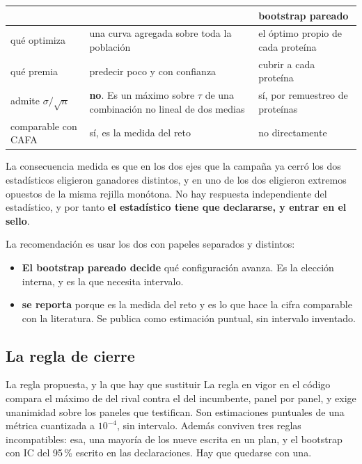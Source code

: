 \begin{center}
\begin{tabularx}{\linewidth}{@{}L{3.2cm} X X@{}}
\toprule
 &  & bootstrap pareado\\
\midrule
qué optimiza & una curva agregada sobre toda la población & el óptimo propio de cada proteína\\
qué premia   & predecir poco y con confianza & cubrir a cada proteína\\
admite $\sigma/\sqrt{n}$ & \textbf{no}. Es un máximo sobre $\tau$ de una combinación no lineal de dos medias & sí, por remuestreo de proteínas\\
comparable con CAFA & sí, es la medida del reto & no directamente\\
\bottomrule
\end{tabularx}
\end{center}

La consecuencia medida es que en los dos ejes que la campaña ya cerró los dos
estadísticos eligieron ganadores distintos, y en uno de los dos eligieron extremos
opuestos de la misma rejilla monótona. No hay respuesta independiente del
estadístico, y por tanto \textbf{el estadístico tiene que declararse, y entrar en
el sello}.

La recomendación es usar los dos con papeles separados y distintos:

\begin{itemize}[leftmargin=1.4em,itemsep=0.3em]
  \item \textbf{El bootstrap pareado decide} qué configuración avanza. Es la
        elección interna, y es la que necesita intervalo.
  \item \textbf{ se reporta} porque es la medida del reto y es lo que
        hace la cifra comparable con la literatura. Se publica como estimación
        puntual, sin intervalo inventado.
\end{itemize}

\subsection{La regla de cierre}

\begin{aviso}{La regla propuesta, y la que hay que sustituir}
La regla en vigor en el código compara el máximo de  del rival
contra el del incumbente, panel por panel, y exige unanimidad sobre los paneles que
testifican. Son estimaciones puntuales de una métrica cuantizada a $10^{-4}$, sin
intervalo. Además conviven tres reglas incompatibles: esa, una mayoría de los nueve
escrita en un plan, y el bootstrap con IC del 95\,\% escrito en las declaraciones.
Hay que quedarse con una.
\end{aviso}

